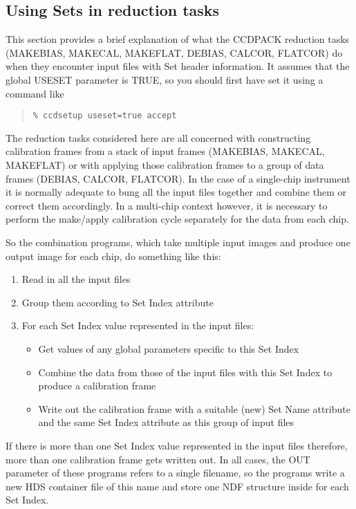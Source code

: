 \documentclass[twoside,11pt]{article}
\newcommand{\htmlref}[2]{#1}
\newcommand{\latexhtml}[2]{#1}
\newcommand{\xlabel}[1]{}
\renewcommand{\_}{\texttt{\symbol{95}}}
\newcommand{\ttsize}{\latexhtml{\small}{}}
\newenvironment{myquote}{\begin{quote}\ttsize}{\end{quote}}
\newcommand{\routine}[1]{{\sc #1}}
\newcommand{\xroutine}[1]{\htmlref{{\sc #1}}{#1}}
\begin{document}
\subsection{\xlabel{setreduce}Using Sets in reduction tasks}

This section provides a brief explanation of what the CCDPACK
reduction tasks 
(\xroutine{MAKEBIAS}, \xroutine{MAKECAL}, \xroutine{MAKEFLAT},
\xroutine{DEBIAS}, \xroutine{CALCOR}, \xroutine{FLATCOR})
do when they encounter input files with Set header information.
It assumes that the global USESET parameter is TRUE, 
so you should first have set it using a command like
\begin{myquote}
\begin{verbatim}
% ccdsetup useset=true accept
\end{verbatim}
\end{myquote}

The reduction tasks considered here are all concerned with constructing
calibration frames from a stack of input frames 
(\routine{MAKEBIAS}, \routine{MAKECAL}, \routine{MAKEFLAT})
or with applying those calibration frames to a group of data frames
(\routine{DEBIAS}, \routine{CALCOR}, \routine{FLATCOR}).
In the case of a single-chip instrument it is normally adequate to
bung all the input files together and combine them or correct them
accordingly.  In a multi-chip context however, it is necessary 
to perform the make/apply calibration cycle separately for 
the data from each chip.

So the combination programs, 
which take multiple input images and produce one output image for each chip,
do something like this:
\begin{enumerate}
\item 
Read in all the input files
\item
Group them according to Set Index attribute
\item
For each Set Index value represented in the input files:
\begin{itemize}
\item Get values of any global parameters specific to this Set Index
\item Combine the data from those of the input files with this Set Index
      to produce a calibration frame
\item Write out the calibration frame with a suitable (new) Set Name
      attribute and the same Set Index attribute as this group of input files
\end{itemize}
\end{enumerate}
If there is more than one Set Index value represented in the input files
therefore, more than one calibration frame gets written out.
In all cases, the OUT parameter of these programs refers to a single
filename, so the programs write a new HDS container file of this
name and store one NDF structure inside for each Set Index.
\end{document}
